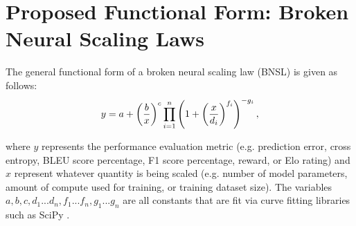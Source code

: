 \section{Proposed Functional Form: Broken Neural Scaling Laws }
\label{sec:bnsl}
\vspace{-0.08in}
The general functional form of a broken neural scaling law (BNSL) is given as follows:
\begin{equation}
\vspace{-0.07in}
y =  a + \left(\frac{b}{x}\right)^c \prod_{i=1}^n \left(1 + \left(\frac{x}{d_i}\right)^{f_i}\right)^{-g_i},
\label{eq:UniversalScalingLaw}
\vspace{-0.07in}
\end{equation}
\begin{comment}
\iffalse
When $a = 0$, applying logarithms to both sides yields:
\begin{equation}
\log (y) =  c \log (b) - c \log(x) -  \sum_{i=1}^n g_i \log\left(1 + \left(\frac{x}{d_i}\right)^{f_i}\right).
\end{equation}
TODO: I (David) made the above to try and get more intuition on this.  I guess it's not actually piece-wise linear (hence the SMOOTHLY broken)?
\fi
\end{comment}
where $y$ represents the performance evaluation metric (e.g. prediction error, cross entropy, BLEU score percentage, F1 score percentage, reward, or Elo rating) and $x$ represent whatever quantity is being scaled (e.g. number of model parameters, amount of compute used for training, or training dataset size). The variables $a, b, c, d_1 ...  d_n, f_1 ... f_n, g_1 ... g_n$ are all constants that are fit via curve fitting libraries such as SciPy \cite{virtanen2020scipy}.

